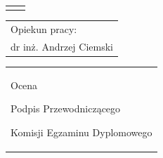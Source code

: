 \begin{titlepage}
{\begin{center}
	\begin{tabular}[b]{@{}p{3cm}@{\ }l@{}}
		{\large\hfill } & {\large }
	\end{tabular}
	\hfill
	\begin{tabular}[b]{@{}l@{}}
		Opiekun pracy: \\[\smallskipamount]
		{\large dr inż. Andrzej Ciemski}
	\end{tabular}\par
	\vspace*{1\baselineskip}
	\begin{tabular}{p{\textwidth}}
		\begin{flushleft}
			\begin{minipage}{7cm}
				Ocena \dotfill
				\par\vspace{1.6\baselineskip}
				\dotfill
				\par\noindent
				\centerline{\footnotesize Podpis Przewodniczącego} \par
				\centerline{\footnotesize Komisji Egzaminu Dyplomowego}\par
			\end{minipage}
		\end{flushleft}
	\end{tabular}
\end{center}}


\end{titlepage}
